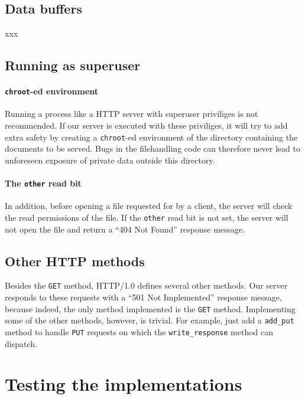 \documentclass[11pt]{article}
\begin{document}
\subsection{Data buffers}

xxx


\subsection{Running as superuser}

\paragraph{\lstinline|chroot|-ed environment}

Running a process like a HTTP server with superuser priviliges is not
recommended. If our server is executed with these priviliges, it will try to
add extra safety by creating a \lstinline|chroot|-ed environment of the
directory containing the documents to be served. Bugs in the filehandling code
can therefore never lead to unforeseen exposure of private data outside this
directory.

\paragraph{The \lstinline|other| read bit}

In addition, before opening a file requested for by a client, the server will
check the read permissions of the file. If the \lstinline|other| read bit is
not set, the server will not open the file and return a ``404 Not Found''
response message.


\subsection{Other HTTP methods}

Besides the \lstinline|GET| method, HTTP/1.0 defines several other
methods. Our server responds to these requests with a ``501 Not Implemented''
response message, because indeed, the only method implemented is the
\lstinline|GET| method. Implementing some of the other methods, however, is
trivial. For example, just add a \lstinline|add_put| method to handle
\lstinline|PUT| requests on which the \lstinline|write_response| method can
dispatch.


\section{Testing the implementations}
\end{document}
